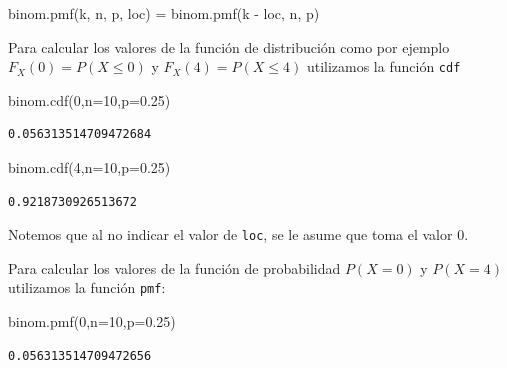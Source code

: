 \documentclass[
  letterpaper,
  DIV=11,
  numbers=noendperiod]{scrreprt}
\newenvironment{Shaded}{\begin{snugshade}}{\end{snugshade}}
\newcommand{\DecValTok}[1]{\textcolor[rgb]{0.68,0.00,0.00}{#1}}
\newcommand{\FloatTok}[1]{\textcolor[rgb]{0.68,0.00,0.00}{#1}}
\newcommand{\NormalTok}[1]{\textcolor[rgb]{0.00,0.23,0.31}{#1}}
\newcommand{\OperatorTok}[1]{\textcolor[rgb]{0.37,0.37,0.37}{#1}}
\begin{document}
\begin{Shaded}
\begin{Highlighting}[]
\NormalTok{binom.pmf(k, n, p, loc) }\OperatorTok{=}\NormalTok{  binom.pmf(k }\OperatorTok{{-}}\NormalTok{ loc, n, p)}
\end{Highlighting}
\end{Shaded}

Para calcular los valores de la función de distribución como por ejemplo
\(F_X(0)=P(X\leq 0)\) y \(F_X(4)=P(X\leq 4)\) utilizamos la función
\texttt{cdf}

\begin{Shaded}
\begin{Highlighting}[]
\NormalTok{binom.cdf(}\DecValTok{0}\NormalTok{,n}\OperatorTok{=}\DecValTok{10}\NormalTok{,p}\OperatorTok{=}\FloatTok{0.25}\NormalTok{)}
\end{Highlighting}
\end{Shaded}

\begin{verbatim}
0.056313514709472684
\end{verbatim}

\begin{Shaded}
\begin{Highlighting}[]
\NormalTok{binom.cdf(}\DecValTok{4}\NormalTok{,n}\OperatorTok{=}\DecValTok{10}\NormalTok{,p}\OperatorTok{=}\FloatTok{0.25}\NormalTok{)}
\end{Highlighting}
\end{Shaded}

\begin{verbatim}
0.9218730926513672
\end{verbatim}

Notemos que al no indicar el valor de \texttt{loc}, se le asume que toma
el valor 0.

Para calcular los valores de la función de probabilidad \(P(X=0)\) y
\(P(X=4)\) utilizamos la función \texttt{pmf}:

\begin{Shaded}
\begin{Highlighting}[]
\NormalTok{binom.pmf(}\DecValTok{0}\NormalTok{,n}\OperatorTok{=}\DecValTok{10}\NormalTok{,p}\OperatorTok{=}\FloatTok{0.25}\NormalTok{)}
\end{Highlighting}
\end{Shaded}

\begin{verbatim}
0.056313514709472656
\end{verbatim}
\end{document}
